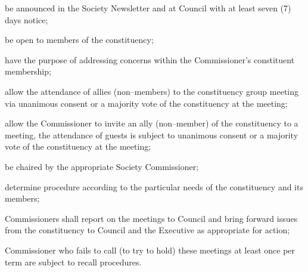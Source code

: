 \begin{longenum}[ label*=\thesubsection.\arabic*., align=left]
\begin{longenum}[ label*=\arabic*., align=left]
\item be announced in the Society Newsletter and at Council with at least seven (7) days notice;
\item be open to members of the constituency;
\item have the purpose of addressing concerns within the Commissioner's constituent membership;
\item allow the attendance of allies (non--members) to the constituency group meeting via unanimous consent or a majority vote of the constituency at the meeting;
\item allow the Commissioner to invite an ally (non--member) of the constituency to a meeting, the attendance of guests is subject to unanimous consent or a majority vote of the constituency at the meeting;
\item be chaired by the appropriate Society Commissioner;
\item determine procedure according to the particular needs of the constituency and its members;
\end{longenum}
\item Commissioners shall report on the meetings to Council and bring forward issues from the constituency to Council and the Executive as appropriate for action;
\item Commissioner who fails to call (to try to hold) these meetings at least once per term are subject to recall procedures.
\end{longenum}


